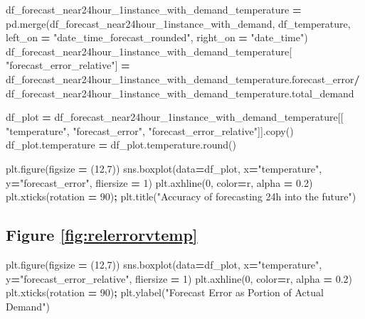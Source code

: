 \documentclass[mstat,12pt]{unswthesis}
\newenvironment{Shaded}{\begin{snugshade}}{\end{snugshade}}
\newcommand{\BuiltInTok}[1]{#1}
\newcommand{\DecValTok}[1]{\textcolor[rgb]{0.00,0.00,0.81}{#1}}
\newcommand{\FloatTok}[1]{\textcolor[rgb]{0.00,0.00,0.81}{#1}}
\newcommand{\NormalTok}[1]{#1}
\newcommand{\OperatorTok}[1]{\textcolor[rgb]{0.81,0.36,0.00}{\textbf{#1}}}
\newcommand{\StringTok}[1]{\textcolor[rgb]{0.31,0.60,0.02}{#1}}
\begin{document}
\begin{Shaded}
\begin{Highlighting}[]
\NormalTok{df\_forecast\_near24hour\_1instance\_with\_demand\_temperature }\OperatorTok{=} 
\NormalTok{    pd.merge(df\_forecast\_near24hour\_1instance\_with\_demand, }
\NormalTok{        df\_temperature, left\_on }\OperatorTok{=} \StringTok{"date\_time\_forecast\_rounded"}\NormalTok{, }
\NormalTok{        right\_on }\OperatorTok{=} \StringTok{"date\_time"}\NormalTok{)}
\NormalTok{df\_forecast\_near24hour\_1instance\_with\_demand\_temperature[}
  \StringTok{"forecast\_error\_relative"}\NormalTok{] }\OperatorTok{=}
\NormalTok{  df\_forecast\_near24hour\_1instance\_with\_demand\_temperature.forecast\_error}\OperatorTok{/}
\NormalTok{  df\_forecast\_near24hour\_1instance\_with\_demand\_temperature.total\_demand}

\NormalTok{df\_plot }\OperatorTok{=}\NormalTok{ df\_forecast\_near24hour\_1instance\_with\_demand\_temperature[[}
  \StringTok{"temperature"}\NormalTok{, }\StringTok{"forecast\_error"}\NormalTok{, }\StringTok{"forecast\_error\_relative"}\NormalTok{]].copy()}
\NormalTok{df\_plot.temperature }\OperatorTok{=}\NormalTok{ df\_plot.temperature.}\BuiltInTok{round}\NormalTok{()}

\NormalTok{plt.figure(figsize }\OperatorTok{=}\NormalTok{ (}\DecValTok{12}\NormalTok{,}\DecValTok{7}\NormalTok{))}
\NormalTok{sns.boxplot(data}\OperatorTok{=}\NormalTok{df\_plot, x}\OperatorTok{=}\StringTok{"temperature"}\NormalTok{, y}\OperatorTok{=}\StringTok{"forecast\_error"}\NormalTok{, }
\NormalTok{    fliersize }\OperatorTok{=} \DecValTok{1}\NormalTok{)}
\NormalTok{plt.axhline(}\DecValTok{0}\NormalTok{, color}\OperatorTok{=}\StringTok{\textquotesingle{}r\textquotesingle{}}\NormalTok{, alpha }\OperatorTok{=} \FloatTok{0.2}\NormalTok{)}
\NormalTok{plt.xticks(rotation }\OperatorTok{=} \DecValTok{90}\NormalTok{)}\OperatorTok{;}
\NormalTok{plt.title(}\StringTok{"Accuracy of forecasting 24h into the future"}\NormalTok{)}
\end{Highlighting}
\end{Shaded}

\subsection*{Figure \ref{fig:relerrorvtemp}}\label{figure-reffigrelerrorvtemp}

\begin{Shaded}
\begin{Highlighting}[]
\NormalTok{plt.figure(figsize }\OperatorTok{=}\NormalTok{ (}\DecValTok{12}\NormalTok{,}\DecValTok{7}\NormalTok{))}
\NormalTok{sns.boxplot(data}\OperatorTok{=}\NormalTok{df\_plot, x}\OperatorTok{=}\StringTok{"temperature"}\NormalTok{, }
\NormalTok{    y}\OperatorTok{=}\StringTok{"forecast\_error\_relative"}\NormalTok{, fliersize }\OperatorTok{=} \DecValTok{1}\NormalTok{)}
\NormalTok{plt.axhline(}\DecValTok{0}\NormalTok{, color}\OperatorTok{=}\StringTok{\textquotesingle{}r\textquotesingle{}}\NormalTok{, alpha }\OperatorTok{=} \FloatTok{0.2}\NormalTok{)}
\NormalTok{plt.xticks(rotation }\OperatorTok{=} \DecValTok{90}\NormalTok{)}\OperatorTok{;}
\NormalTok{plt.ylabel(}\StringTok{"Forecast Error as Portion of Actual Demand"}\NormalTok{)}
\end{Highlighting}
\end{Shaded}
\end{document}
